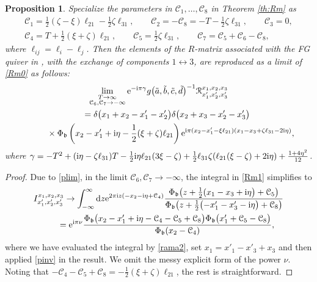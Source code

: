\documentclass[pdftex]{sigma}
\newcommand{\bb}{{\mathfrak b}}
\newcommand{\e}{{\mathrm e}}
\numberwithin{equation}{section}
\newtheorem{Proposition}[Theorem]{Proposition}
 { \theoremstyle{definition}
\newtheorem{Example}[Theorem]{Example}
\newtheorem{Remark}[Theorem]{Remark} }
\begin{document}
\begin{Proposition}\label{pr:lim}
Specialize the parameters in $\mathcal{C}_1,\dotsc, \mathcal{C}_8$ in
Theorem {\rm\ref{th:Rm}} as
\begin{gather*}%
{\mathcal C}_1 = \frac{1}{2}(\zeta-\xi)\ell_{21}-\frac{1}{2}\zeta\ell_{31},
\qquad
{\mathcal C}_2 = -{\mathcal C}_8 = -T - \frac{1}{2}\zeta\ell_{31}, \qquad
{\mathcal C}_3=0,
\\
{\mathcal C}_4 = T + \frac{1}{2}(\xi+\zeta)\ell_{21},\qquad
{\mathcal C}_5 = \frac{1}{2}\zeta\ell_{31},
\qquad
{\mathcal C}_7 = {\mathcal C}_5+{\mathcal C}_6-{\mathcal C}_8,
\end{gather*}
where $\ell_{ij}=\ell_i-\ell_j$.
Then the elements of the $R$-matrix associated with the FG quiver in {\rm\cite[\emph{Proposition}~7.4]{IKT1}},
with the exchange of components $1 \leftrightarrow 3$,
are reproduced as a limit of \eqref{Rm0} as follows:
\begin{gather*}
\lim_{\substack{ T \rightarrow \infty\\{\mathcal C}_6,{\mathcal C}_7\rightarrow -\infty}}
\e^{-{\rm i}\pi\gamma}g\bigl(\tilde{a}, \tilde{b}, \tilde{c}, \tilde{d}\bigr)^{-1}{\mathcal R}^{x_1,x_2,x_3}_{x'_1,x'_2, x'_3}
\\
\qquad= \delta\bigl(x_1+x_2-x'_1-x'_2\bigr)\delta\bigl(x_2+x_3-x'_2-x'_3\bigr)
\\
 \phantom{\qquad= }{} \times
\Phi_\bb\left(x_2-x'_1+{\rm i}\eta-\frac{1}{2}(\xi+\zeta)\ell_{21}\right)
\e^{{\rm i}\pi(x_2-x'_1-\xi\ell_{21})(x_1-x_3+\zeta\ell_{31}-2{\rm i}\eta)},
\end{gather*}
where
$\gamma= -T^2+({\rm i}\eta -\zeta \ell_{31})T -\tfrac{1}{2}{\rm i}\eta \ell_{21}(3\xi-\zeta)
+\tfrac{1}{2}\ell_{31}\zeta(\ell_{21}(\xi-\zeta)+2{\rm i}\eta)+\tfrac{1+4\eta^2}{12}
$.
\end{Proposition}
\begin{proof}
Due to \eqref{plim},
in the limit ${\mathcal C}_6, {\mathcal C}_7 \rightarrow -\infty$,
the integral  in \eqref{Rm1} simplifies to
\begin{gather*}
 I^{x_1,x_2,x_3}_{x'_1,x'_2, x'_3} \rightarrow
\int_{-\infty}^\infty {\rm d}z \e^{2\pi {\rm i}z(-x_2-{\rm i}\eta+{\mathcal C}_4)}
\frac{\Phi_\bb\bigl(z+\frac{1}{2}(x_1-x_3+{\rm i}\eta\bigr)+{\mathcal C}_5\bigr)}
{\Phi_\bb\bigl(z+\frac{1}{2}\bigl(-x'_1-x'_3-{\rm i}\eta\bigr)+{\mathcal C}_8\bigr)}
\\
\qquad= \e^{ {\rm i} \pi \nu}\frac{\Phi_\bb\bigl(x_2-x'_1+{\rm i}\eta-{\mathcal C}_4-{\mathcal C}_5+{\mathcal C}_8\bigr)
\Phi_\bb\bigl(x'_1+{\mathcal C}_5-{\mathcal C}_8\bigr)}{\Phi_\bb(x_2-{\mathcal C}_4)},
\end{gather*}
where we have evaluated the integral by \eqref{rama2}, set
$x_1=x'_1-x'_3+x_3$ and then applied \eqref{pinv} in the result.
We omit the messy explicit form of the power $\nu$.
Noting that $-{\mathcal C}_4-{\mathcal C}_5+{\mathcal C}_8 = -\frac{1}{2}(\xi+\zeta)\ell_{21}$, the rest is straightforward.
\end{proof}
\end{document}
